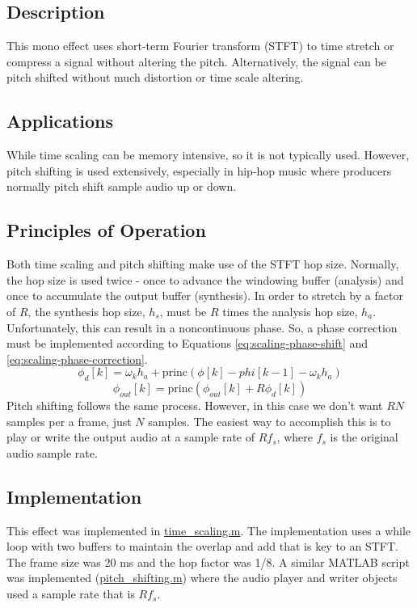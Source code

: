 \subsection{Description}
This mono effect uses short-term Fourier transform (STFT) to time stretch or compress a signal without altering the pitch. Alternatively, the signal can be pitch shifted without much distortion or time scale altering.

\subsection{Applications}
While time scaling can be memory intensive, so it is not typically used. However, pitch shifting is used extensively, especially in hip-hop music where producers normally pitch shift sample audio up or down.

\subsection{Principles of Operation}
Both time scaling and pitch shifting make use of the STFT hop size. Normally, the hop size is used twice - once to advance the windowing buffer (analysis) and once to accumulate the output buffer (synthesis). In order to stretch by a factor of $R$, the synthesis hop size, $h_s$, must be $R$ times the analysis hop size, $h_a$. Unfortunately, this can result in a noncontinuous phase. So, a phase correction must be implemented according to Equations \ref{eq:scaling-phase-shift} and \ref{eq:scaling-phase-correction}.
\begin{equation}
    \phi_d[k] = \omega_k h_a + \mathrm{princ}(\phi[k] - phi[k - 1] - \omega_k h_a)
    \label{eq:scaling-phase-shift}
\end{equation}
\begin{equation}
    \phi_{out}[k] = \mathrm{princ}(\phi_{out}[k] + R \phi_d[k])
    \label{eq:scaling-phase-correction}
\end{equation}
Pitch shifting follows the same process. However, in this case we don't want $RN$ samples per a frame, just $N$ samples. The easiest way to accomplish this is to play or write the output audio at a sample rate of $R f_s$, where $f_s$ is the original audio sample rate.

\subsection{Implementation}
This effect was implemented in \href{run:time_scaling.m}{time\_scaling.m}. The implementation uses a while loop with two buffers to maintain the overlap and add that is key to an STFT. The frame size was 20 ms and the hop factor was 1/8. A similar MATLAB script was implemented (\href{run:pitch_shifting.m}{pitch\_shifting.m}) where the audio player and writer objects used a sample rate that is $R f_s$.


